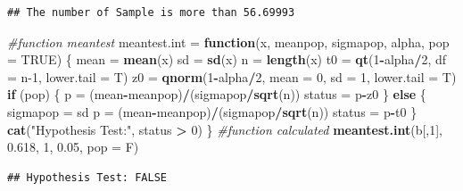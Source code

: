 \documentclass[]{ctexbook}
\newenvironment{Shaded}{\begin{snugshade}}{\end{snugshade}}
\newcommand{\CommentTok}[1]{\textcolor[rgb]{0.56,0.35,0.01}{\textit{#1}}}
\newcommand{\ControlFlowTok}[1]{\textcolor[rgb]{0.13,0.29,0.53}{\textbf{#1}}}
\newcommand{\DataTypeTok}[1]{\textcolor[rgb]{0.13,0.29,0.53}{#1}}
\newcommand{\DecValTok}[1]{\textcolor[rgb]{0.00,0.00,0.81}{#1}}
\newcommand{\FloatTok}[1]{\textcolor[rgb]{0.00,0.00,0.81}{#1}}
\newcommand{\KeywordTok}[1]{\textcolor[rgb]{0.13,0.29,0.53}{\textbf{#1}}}
\newcommand{\NormalTok}[1]{#1}
\newcommand{\OperatorTok}[1]{\textcolor[rgb]{0.81,0.36,0.00}{\textbf{#1}}}
\newcommand{\OtherTok}[1]{\textcolor[rgb]{0.56,0.35,0.01}{#1}}
\newcommand{\StringTok}[1]{\textcolor[rgb]{0.31,0.60,0.02}{#1}}
\begin{document}
\begin{verbatim}
## The number of Sample is more than 56.69993
\end{verbatim}

\begin{Shaded}
\begin{Highlighting}[]
\CommentTok{#function meantest}
\NormalTok{meantest.int =}\StringTok{ }\ControlFlowTok{function}\NormalTok{(x, meanpop, sigmapop, alpha, }\DataTypeTok{pop =} \OtherTok{TRUE}\NormalTok{) \{}
\NormalTok{  mean =}\StringTok{ }\KeywordTok{mean}\NormalTok{(x)}
\NormalTok{  sd =}\StringTok{ }\KeywordTok{sd}\NormalTok{(x)}
\NormalTok{  n =}\StringTok{ }\KeywordTok{length}\NormalTok{(x)}
\NormalTok{  t0 =}\StringTok{ }\KeywordTok{qt}\NormalTok{(}\DecValTok{1}\OperatorTok{-}\NormalTok{alpha}\OperatorTok{/}\DecValTok{2}\NormalTok{, }\DataTypeTok{df =}\NormalTok{ n}\DecValTok{-1}\NormalTok{, }\DataTypeTok{lower.tail =}\NormalTok{ T)}
\NormalTok{  z0 =}\StringTok{ }\KeywordTok{qnorm}\NormalTok{(}\DecValTok{1}\OperatorTok{-}\NormalTok{alpha}\OperatorTok{/}\DecValTok{2}\NormalTok{, }\DataTypeTok{mean =} \DecValTok{0}\NormalTok{, }\DataTypeTok{sd =} \DecValTok{1}\NormalTok{, }\DataTypeTok{lower.tail =}\NormalTok{ T)}
  \ControlFlowTok{if}\NormalTok{ (pop) \{}
\NormalTok{    p =}\StringTok{ }\NormalTok{(mean}\OperatorTok{-}\NormalTok{meanpop)}\OperatorTok{/}\NormalTok{(sigmapop}\OperatorTok{/}\KeywordTok{sqrt}\NormalTok{(n))}
\NormalTok{    status =}\StringTok{ }\NormalTok{p}\OperatorTok{-}\NormalTok{z0}
\NormalTok{  \} }\ControlFlowTok{else}\NormalTok{ \{}
\NormalTok{    sigmapop =}\StringTok{ }\NormalTok{sd}
\NormalTok{    p =}\StringTok{ }\NormalTok{(mean}\OperatorTok{-}\NormalTok{meanpop)}\OperatorTok{/}\NormalTok{(sigmapop}\OperatorTok{/}\KeywordTok{sqrt}\NormalTok{(n))}
\NormalTok{    status =}\StringTok{ }\NormalTok{p}\OperatorTok{-}\NormalTok{t0}
\NormalTok{  \}}
  \KeywordTok{cat}\NormalTok{(}\StringTok{"Hypothesis Test:"}\NormalTok{, status }\OperatorTok{>}\StringTok{ }\DecValTok{0}\NormalTok{)}
\NormalTok{\}}
\CommentTok{#function calculated}
\KeywordTok{meantest.int}\NormalTok{(b[,}\DecValTok{1}\NormalTok{], }\FloatTok{0.618}\NormalTok{, }\DecValTok{1}\NormalTok{, }\FloatTok{0.05}\NormalTok{, }\DataTypeTok{pop =}\NormalTok{ F)}
\end{Highlighting}
\end{Shaded}

\begin{verbatim}
## Hypothesis Test: FALSE
\end{verbatim}
\end{document}
